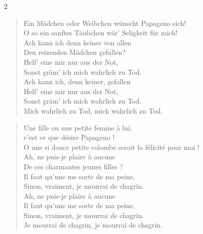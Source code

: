 \documentclass[a4paper,12pt]{article}
\newcommand\chunks[2]{%
\begin{leftcolumn*}\begin{otherlanguage}{german}%
{#1}%
\end{otherlanguage}\end{leftcolumn*}%
\begin{rightcolumn}\begin{otherlanguage}{french}%
{#2}%
\end{otherlanguage}\end{rightcolumn}%
}
\begin{document}
\begin{paracol}{2}
  \chunks{\begin{verse}
          Ein Mädchen oder Weibchen wünscht Papageno sich!\\
          O so ein sanftes Täubchen wär’ Seligkeit für mich!\\
          Ach kann ich denn keiner von allen\\
          Den reizenden Mädchen gefallen?\\
          Helf’ eine mir nur aus der Not,\\
          Sonst gräm’ ich mich wahrlich zu Tod.\\
          Ach kann ich, denn keiner, gefallen\\
          Helf’ eine mir nur aus der Not,\\
          Sonst gräm’ ich mich wahrlich zu Tod.\\
          Mich wahrlich zu Tod, mich wahrlich zu Tod.
          \end{verse}}
         {\begin{verse}
          Une fille ou une petite femme à lui,\\
          c’est ce que désire Papageno !\\
          O une si douce petite colombe serait la félicité pour moi !\\
          Ah, ne puis-je plaire à aucune\\
          De ces charmantes jeunes filles ?\\
          Il faut qu’une me sorte de ma peine,\\
          Sinon, vraiment, je mourrai de chagrin.\\
          Ah, ne puis-je plaire à aucune\\
          Il faut qu’une me sorte de ma peine,\\
          Sinon, vraiment, je mourrai de chagrin.\\
          Je mourrai de chagrin, je mourrai de chagrin.
          \end{verse}}


\end{paracol}
\end{document}
